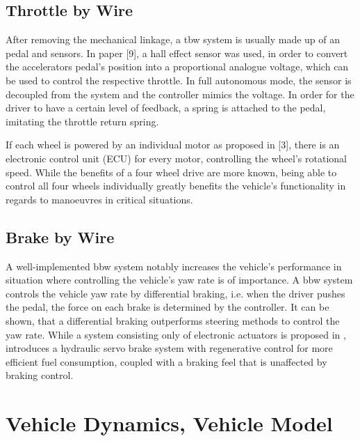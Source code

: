 \documentclass[conference]{IEEEtran}
\begin{document}
\newpage

\subsection{Throttle by Wire}

After removing the mechanical linkage, a tbw system is usually made up of an pedal and sensors. In paper [9], a hall effect sensor was used, in order to convert the accelerators pedal's position into a proportional analogue voltage, which can be used to control the respective throttle. In full autonomous mode, the sensor is decoupled from the system and the controller mimics the voltage. In order for the driver to have a certain level of feedback, a spring is attached to the pedal, imitating the throttle return spring. 

If each wheel is powered by an individual motor as proposed in [3], there is an electronic control unit (ECU) for every motor, controlling the wheel's rotational speed. While the benefits of a four wheel drive are more known, being able to control all four wheels individually greatly benefits the vehicle's functionality in regards to manoeuvres in critical situations. 

\subsection{Brake by Wire}

A well-implemented bbw system notably increases the vehicle's performance in situation where controlling the vehicle's yaw rate is of importance. A bbw system controls the vehicle yaw rate by differential braking, i.e. when the driver pushes the pedal, the force on each brake is determined by the controller. It can be shown, that a differential braking outperforms steering methods to control the yaw rate.
While a system consisting only of electronic actuators is proposed in \cite{Weidong}, \cite{Aoki} introduces a hydraulic servo brake system with regenerative control for more efficient fuel consumption, coupled with a braking feel that is unaffected by braking control.



\section{Vehicle Dynamics, Vehicle Model}
\end{document}
